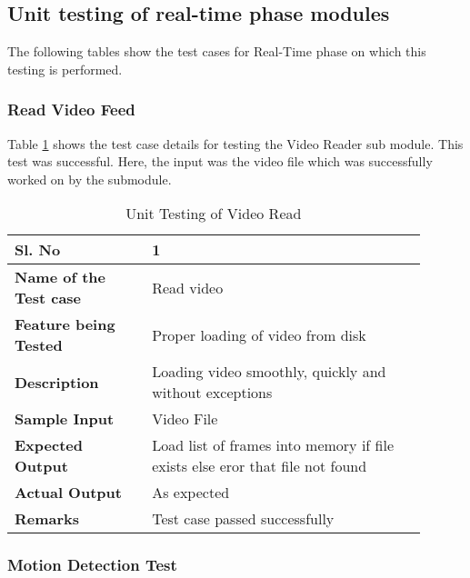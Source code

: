     \subsection{Unit testing of real-time phase modules}
    The following tables show the test cases for Real-Time phase on which this testing is performed.

        \subsubsection{Read Video Feed}

        Table \ref{table:unit-video-read} shows the test case details for testing the Video Reader sub module. This test was successful. Here, the input was the video file which was successfully worked on by the submodule.

        \FloatBarrier
        \begin{table}[H]
            \begin{tabular}{|p{0.3\linewidth}|p{0.6\linewidth}|}
                \hline
                \textbf{Sl. No }              &\textbf{ 1}\\
                \hline
                \textbf{Name of the Test case}  & Read video \\
                \hline
                \textbf{Feature being Tested}  & Proper loading of video from disk \\
                \hline
                \textbf{Description}           &  Loading video smoothly, quickly and without exceptions \\
                \hline
                \textbf{Sample Input}          & Video File \\
                \hline
                \textbf{Expected Output}       & Load list of frames into memory if file exists else eror that file not found \\
                \hline
                \textbf{Actual Output}         & As expected \\
                \hline
                \textbf{Remarks }              & Test case passed successfully \\
                \hline
            \end{tabular}
            \caption{Unit Testing of Video Read}
            \label{table:unit-video-read}
        \end{table}


        \subsubsection{Motion Detection Test}

